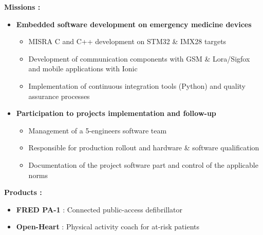 {\begin{itemize}[leftmargin=\ListItemsMargins]
	\end{itemize}
\else
	\textcolor{color1}{\textbf{Missions :}}
	\begin{itemize}[leftmargin=\ListItemsMargins]
		\item \textbf{Embedded software development on emergency medicine devices}
		\begin{itemize}
			\item MISRA C and C++ development on STM32 \& IMX28 targets
			\item Development of communication components with GSM \& Lora/Sigfox and mobile applications with Ionic
			\item Implementation of continuous integration tools (Python) and quality assurance processes
		\end{itemize}
		\item \textbf{Participation to projects implementation and follow-up}
		\begin{itemize}
			\ifaddmngt \item Management of a 5-engineers software team \fi
			\item Responsible for production rollout and hardware \& software qualification
			\item Documentation of the project software part and control of the applicable norms
		\end{itemize}
	\end{itemize}
	\textcolor{color1}{\textbf{Products :}}
	\begin{itemize}[leftmargin=\ListItemsMargins]
		\item \textbf{FRED PA-1} : Connected public-access defibrillator \textcolor{color1}{\href{http://www.schiller.ch/corp/en/product/fred-pa-1}{\ExternalLink}}
		\item \textbf{Open-Heart} : Physical activity coach for at-risk patients \textcolor{color1}{\href{http://www.schiller.ch/corp/en/schiller-cutting-edge-connected-health}{\ExternalLink}}
	\end{itemize}
\fi
}



\vspace{\ItemsMaxSpacing}

